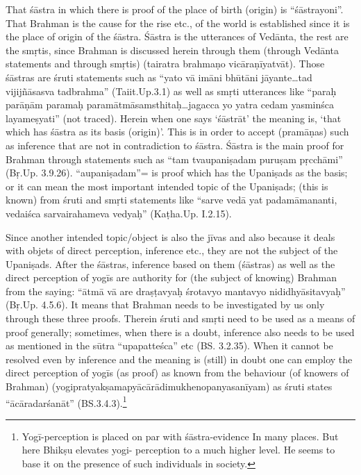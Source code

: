 That śāstra in which there is proof of the place of birth (origin) is “śāstrayoni”. That Brahman is the cause for the rise etc., of the world is established since it is the place of origin of the śāstra. Śāstra is the utterances of Vedānta, the rest are the smṛtis, since Brahman is discussed herein through them (through Vedānta statements and through smṛtis) (tairatra brahmaṇo vicāraṇīyatvāt). Those śāstras are śruti statements such as “yato vā imāni bhūtāni jāyante…tad vijijñāsasva tadbrahma” (Taiit.Up.3.1) as well as smṛti utterances like “paraḥ parāṇām paramaḥ paramātmāsamsthitaḥ…jagacca yo yatra cedam yasminśca layameṣyati” (not traced). Herein when one says ‘śāstrāt’ the meaning is, ‘that which has śāstra as its basis (origin)’. This is in order to accept (pramāṇas) such as inference that are not in contradiction to śāstra. Śāstra is the main proof for Brahman through statements such as “tam tvaupaniṣadam puruṣam pṛcchāmi” (Bṛ.Up. 3.9.26). “aupaniṣadam”= is proof which has the Upaniṣads as the basis; or it can mean the most important intended topic of the Upaniṣads; (this is known) from śruti and smṛti statements like “sarve vedā yat padamāmananti, vedaiśca sarvairahameva vedyaḥ” (Kaṭha.Up. I.2.15).

Since another intended topic/object is also the jīvas and also because it deals with objets of direct perception, inference etc., they are not the subject  of the Upaniṣads. After the śāstras, inference based on them (śāstras) as well as the direct perception of yogīs are authority for (the subject of knowing) Brahman from the saying: “ātmā vā are draṣṭavyaḥ śrotavyo mantavyo nididhyāsitavyaḥ” (Bṛ.Up. 4.5.6). It means that Brahman needs to be investigated by us only through these three proofs. Therein śruti and smṛti need to be used as a means of proof generally; sometimes, when there is a doubt, inference also needs to be used as mentioned in the sūtra “upapatteśca” etc (BS. 3.2.35). When it cannot be resolved even by inference and the meaning is (still) in doubt one can employ the direct perception of yogīs (as proof) as known from the behaviour (of knowers of Brahman) (yogipratyakṣamapyācārādimukhenopanyasanīyam) as śruti states “ācāradarśanāt” (BS.3.4.3).\footnote{Yogī-perception is placed on par with śāstra-evidence In many places. But here Bhikṣu elevates yogi-
perception to a much higher level. He seems to base it on the presence of such individuals in society.} 


